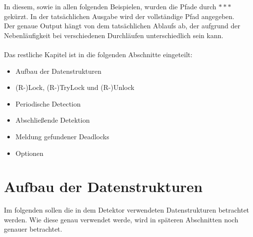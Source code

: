 In diesem, sowie in allen folgenden Beispielen, wurden die Pfade durch $***$ 
gekürzt. In der tatsächlichen
Ausgabe wird der vollständige Pfad angegeben.\\ 
Der genaue Output hängt von dem tatsächlichen Ablaufs ab, der aufgrund der 
Nebenläufigkeit bei verschiedenen Durchläufen unterschiedlich sein kann.\\\\

Das restliche Kapitel ist in die folgenden Abschnitte eingeteilt:
\begin{itemize}
  \item Aufbau der Datenstrukturen
  \item (R-)Lock, (R-)TryLock und (R-)Unlock
  \item Periodische Detection
  \item Abschließende Detektion
  \item Meldung gefundener Deadlocks
  \item Optionen
\end{itemize}
\section{Aufbau der Datenstrukturen} \label{Kap::Implementation:Datastructures}
Im folgenden sollen die in dem Detektor verwendeten Datenstrukturen betrachtet 
werden. Wie diese genau verwendet werde, wird in späteren Abschnitten noch 
genauer betrachtet.
